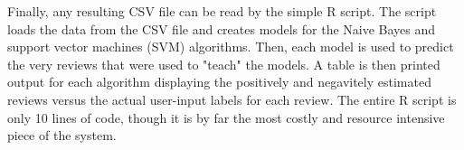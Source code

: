 Finally, any resulting CSV file can be read by the simple R script. The script loads the data from the CSV file and creates models for the Naive Bayes and support vector machines (SVM) algorithms. Then, each model is used to predict the very reviews that were used to "teach" the models. A table is then printed output for each algorithm displaying the positively and negavitely estimated reviews versus the actual user-input labels for each review. The entire R script is only 10 lines of code, though it is by far the most costly and resource intensive piece of the system.
